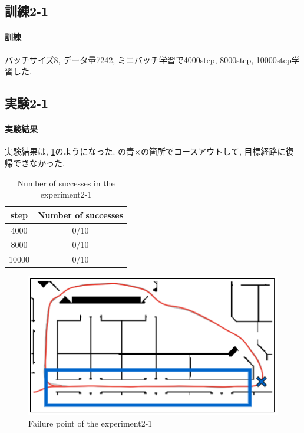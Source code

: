 \vspace{15mm}
\subsection{訓練2-1} 

\paragraph{訓練}
バッチサイズ8, データ量7242, ミニバッチ学習で4000step, 8000step, 10000step学習した.

\subsection{実験2-1}

\paragraph{実験結果}
実験結果は, \ref{tb:exp2}のようになった. の青×の箇所でコースアウトして, 目標経路に復帰できなかった. 

\begin{table}[h]
  \centering
  \begin{tabular}{|c|c|} \hline
    step & Number of successes \\ \hline
    4000 & 0/10 \\ \hline
    8000 & 0/10 \\ \hline
    10000 & 0/10 \\ \hline
  \end{tabular}
  \caption{Number of successes in the experiment2-1}
  \label{tb:exp2}
\end{table}

\begin{figure}[h]
  \centering
  \includegraphics[keepaspectratio, scale=0.6]{images/result2.png}
  \caption{Failure point of the experiment2-1}
  \label{Fig:result2}
  \end{figure}


